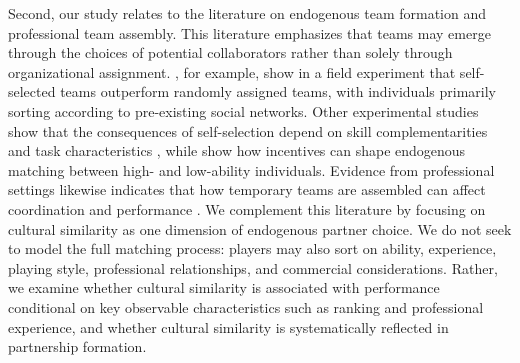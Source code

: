 \documentclass[10pt]{article}
\begin{document}
Second, our study relates to the literature on endogenous team formation and professional team assembly. This literature emphasizes that teams may emerge through the choices of potential collaborators rather than solely through organizational assignment. \citet{chengong2018}, for example, show in a field experiment that self-selected teams outperform randomly assigned teams, with individuals primarily sorting according to pre-existing social networks. Other experimental studies show that the consequences of self-selection depend on skill complementarities and task characteristics \citep{buyukboyacirobbett2019,fischeretal2023}, while \citet{foucarttanzhao2025} show how incentives can shape endogenous matching between high- and low-ability individuals. Evidence from professional settings likewise indicates that how temporary teams are assembled can affect coordination and performance \citep{tonellatoetal2025}. We complement this literature by focusing on cultural similarity as one dimension of endogenous partner choice. We do not seek to model the full matching process: players may also sort on ability, experience, playing style, professional relationships, and commercial considerations. Rather, we examine whether cultural similarity is associated with performance conditional on key observable characteristics such as ranking and professional experience, and whether cultural similarity is systematically reflected in partnership formation.
\end{document}

